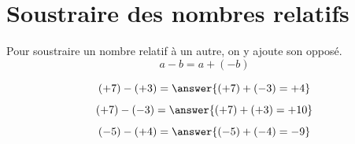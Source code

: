 \section{Soustraire des nombres relatifs}
\begin{propbox}
Pour soustraire un nombre relatif à un autre, on y ajoute son opposé.
$$a-b=a+(-b)$$
\end{propbox}

\begin{exemplebox}
    $$(+7)-(+3) = \answer{(+7)+(-3) = +4}$$
    $$(+7)-(-3) = \answer{(+7)+(+3) = +10}$$
    $$(-5)-(+4) = \answer{(-5)+(-4) = -9}$$
\end{exemplebox}


